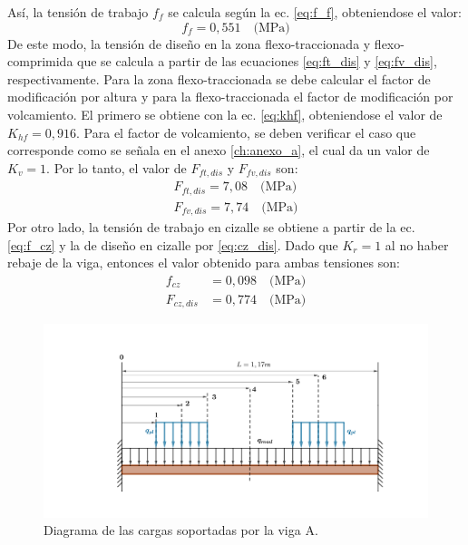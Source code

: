 Así, la tensión de trabajo $f_f$ se calcula según la ec. \ref{eq:f_f}, obteniendose el valor:
\begin{equation}
	f_f = 0,551 \quad \text{(MPa)}
\end{equation}
De este modo, la tensión de diseño en la zona flexo-traccionada y flexo-comprimida que se calcula a partir de las ecuaciones \ref{eq:ft_dis} y \ref{eq:fv_dis}, respectivamente. Para la zona flexo-traccionada se debe calcular el factor de modificación por altura y para la flexo-traccionada el factor de modificación por volcamiento. El primero se obtiene con la ec. \ref{eq:khf}, obteniendose el valor de $K_{hf} = 0,916$. Para el factor de volcamiento, se deben verificar el caso que corresponde como se señala en el anexo \ref{ch:anexo_a}, el cual da un valor de $K_v=1$. Por lo tanto, el valor de $F_{ft,dis}$ y $F_{fv,dis}$ son:
\begin{subequations}
\begin{gather}
	F_{ft,dis} = 7,08 \quad \text{(MPa)}\\
	F_{fv,dis} = 7,74 \quad \text{(MPa)} 
\end{gather}
\end{subequations}
Por otro lado, la tensión de trabajo en cizalle se obtiene a partir de la ec. \ref{eq:f_cz} y la de diseño en cizalle por \ref{eq:cz_dis}. Dado que $K_r=1$ al no haber rebaje de la viga, entonces el valor obtenido para ambas tensiones son:
\begin{align}
	f_{cz} &= 0,098 \quad \text{(MPa)}\\
	F_{cz,dis} &= 0,774 \quad \text{(MPa)}
\end{align}


\begin{figure}[h]
\centering
\includegraphics[width=0.95\linewidth,trim={9cm 3cm 5.3cm 3.5cm},clip]{Imagenes/dia_viga_a.pdf}
\caption{Diagrama de las cargas soportadas por la viga A.}
\label{fig:diagcargas_viga_a}
\end{figure}

